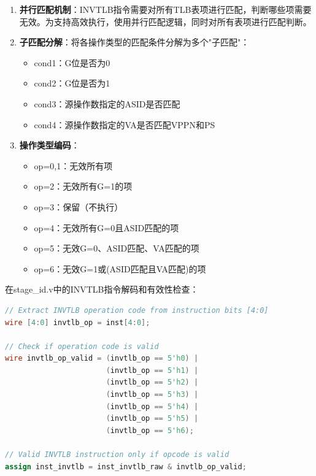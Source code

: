 \begin{enumerate}
    \item \textbf{并行匹配机制}：INVTLB指令需要对所有TLB表项进行匹配，判断哪些项需要无效。为支持高效执行，使用并行匹配逻辑，同时对所有表项进行匹配判断。
    
    \item \textbf{子匹配分解}：将各操作类型的匹配条件分解为多个"子匹配"：
    \begin{itemize}
        \item cond1：G位是否为0
        \item cond2：G位是否为1  
        \item cond3：源操作数指定的ASID是否匹配
        \item cond4：源操作数指定的VA是否匹配VPPN和PS
    \end{itemize}
    
    \item \textbf{操作类型编码}：
    \begin{itemize}
        \item op=0,1：无效所有项
        \item op=2：无效所有G=1的项
        \item op=3：保留（不执行）
        \item op=4：无效所有G=0且ASID匹配的项
        \item op=5：无效G=0、ASID匹配、VA匹配的项
        \item op=6：无效G=1或(ASID匹配且VA匹配)的项
    \end{itemize}
\end{enumerate}

在stage\_id.v中的INVTLB指令解码和有效性检查：

\begin{lstlisting}[language=Verilog, caption=INVTLB指令解码]
// Extract INVTLB operation code from instruction bits [4:0]
wire [4:0] invtlb_op = inst[4:0];

// Check if operation code is valid
wire invtlb_op_valid = (invtlb_op == 5'h0) |
                       (invtlb_op == 5'h1) |
                       (invtlb_op == 5'h2) |
                       (invtlb_op == 5'h3) |
                       (invtlb_op == 5'h4) |
                       (invtlb_op == 5'h5) |
                       (invtlb_op == 5'h6);

// Valid INVTLB instruction only if opcode is valid
assign inst_invtlb = inst_invtlb_raw & invtlb_op_valid;
\end{lstlisting}

